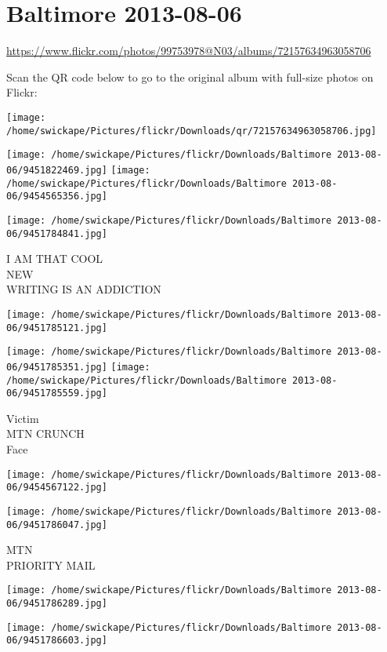 \documentclass[10pt,letterpaper]{article}
\title{}
\author{}
\date{}
\begin{document}
\section*{Baltimore 2013-08-06}

\url{https://www.flickr.com/photos/99753978@N03/albums/72157634963058706}

Scan the QR code below to go to the original album with full-size photos on Flickr:

\texttt{[image: /home/swickape/Pictures/flickr/Downloads/qr/72157634963058706.jpg]}
\pagebreak

\texttt{[image: /home/swickape/Pictures/flickr/Downloads/Baltimore 2013-08-06/9451822469.jpg]}
\texttt{[image: /home/swickape/Pictures/flickr/Downloads/Baltimore 2013-08-06/9454565356.jpg]}

\texttt{[image: /home/swickape/Pictures/flickr/Downloads/Baltimore 2013-08-06/9451784841.jpg]}

I AM THAT COOL\\
NEW\\
WRITING IS AN ADDICTION
\pagebreak

\texttt{[image: /home/swickape/Pictures/flickr/Downloads/Baltimore 2013-08-06/9451785121.jpg]}

\vspace{0.25in}
\texttt{[image: /home/swickape/Pictures/flickr/Downloads/Baltimore 2013-08-06/9451785351.jpg]}
\texttt{[image: /home/swickape/Pictures/flickr/Downloads/Baltimore 2013-08-06/9451785559.jpg]}

Victim\\
MTN CRUNCH\\
Face
\pagebreak

\texttt{[image: /home/swickape/Pictures/flickr/Downloads/Baltimore 2013-08-06/9454567122.jpg]}

\vspace{0.25in}
\texttt{[image: /home/swickape/Pictures/flickr/Downloads/Baltimore 2013-08-06/9451786047.jpg]}

MTN\\
PRIORITY MAIL
\pagebreak

\texttt{[image: /home/swickape/Pictures/flickr/Downloads/Baltimore 2013-08-06/9451786289.jpg]}

\vspace{0.25in}
\texttt{[image: /home/swickape/Pictures/flickr/Downloads/Baltimore 2013-08-06/9451786603.jpg]}
\end{document}
